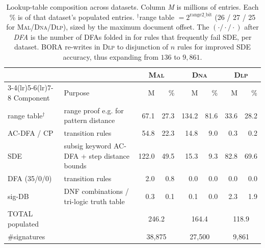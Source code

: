 \begin{table}[t]
\centering
\small
\setlength{\tabcolsep}{4pt}
\begin{tabular}{@{}ll rr rr rr@{}}
\toprule
 & & \multicolumn{2}{c}{\textsc{Mal}} & \multicolumn{2}{c}{\textsc{Dna}} & \multicolumn{2}{c}{\textsc{Dlp}} \\
\cmidrule(lr){3-4}\cmidrule(lr){5-6}\cmidrule(lr){7-8}
Component & Purpose & M & \% & M & \% & M & \% \\
\midrule
range table$^\dagger$ & range proof e.g. for pattern distance & 67.1 & 27.3 & 134.2 & 81.6 & 33.6 & 28.2 \\
AC-DFA / CP & transition rules & 54.8 & 22.3 & 14.8 & 9.0 & 0.3 & 0.2 \\
SDE & subsig keyword AC-DFA + step distance bounds & 122.0 & 49.5 & 15.3 & 9.3 & 82.8 & 69.6 \\
DFA (35/0/0) & transition rules & 2.0 & 0.8 & 0.0 & 0.0 & 0.0 & 0.0 \\
sig-DB & DNF combinations / tri-logic truth table & 0.3 & 0.1 & 0.1 & 0.0 & 2.3 & 1.9 \\
\midrule
TOTAL populated & & \multicolumn{2}{c}{246.2} & \multicolumn{2}{c}{164.4} & \multicolumn{2}{c}{118.9} \\
\#signatures & & \multicolumn{2}{c}{38,875} & \multicolumn{2}{c}{27,500} & \multicolumn{2}{c}{9,861} \\
\bottomrule
\end{tabular}
\caption{Lookup-table composition across datasets. Column \emph{M} is millions of entries. Each \% is of that dataset's populated entries. $^\dagger$range table $=2^{\text{range2\_bit}}$ (26 / 27 / 25 for \textsc{Mal}/\textsc{Dna}/\textsc{Dlp}), sized by the maximum document offset. The $(\cdot/\cdot/\cdot)$ after \emph{DFA} is the number of DFAs folded in for rules that frequently fail SDE, per dataset.
BORA re-writes  in \textsc{Dlp} to disjunction of $n$ rules for improved SDE accuracy, thus expanding from $136$ to $9{,}861$.}
\label{tbl:lkup}
\end{table}
